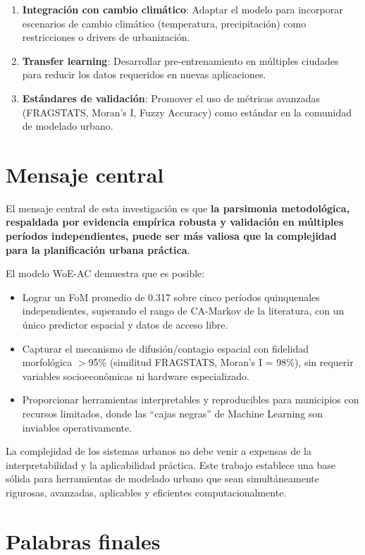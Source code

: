 \begin{enumerate}
	\item \textbf{Integración con cambio climático}: Adaptar el modelo para incorporar escenarios de cambio climático (temperatura, precipitación) como restricciones o drivers de urbanización.
	\item \textbf{Transfer learning}: Desarrollar pre-entrenamiento en múltiples ciudades para reducir los datos requeridos en nuevas aplicaciones.
	\item \textbf{Estándares de validación}: Promover el uso de métricas avanzadas (FRAGSTATS, Moran's I, Fuzzy Accuracy) como estándar en la comunidad de modelado urbano.
\end{enumerate}

\section{Mensaje central}

El mensaje central de esta investigación es que \textbf{la parsimonia metodológica, respaldada por evidencia empírica robusta y validación en múltiples períodos independientes, puede ser más valiosa que la complejidad para la planificación urbana práctica}.

El modelo WoE-AC demuestra que es posible:
\begin{itemize}
	\item Lograr un FoM promedio de 0.317 sobre cinco períodos quinquenales independientes, superando el rango de CA-Markov de la literatura, con un único predictor espacial y datos de acceso libre.
	\item Capturar el mecanismo de difusión/contagio espacial con fidelidad morfológica $>$95\% (similitud FRAGSTATS, Moran's I = 98\%), sin requerir variables socioeconómicas ni hardware especializado.
	\item Proporcionar herramientas interpretables y reproducibles para municipios con recursos limitados, donde las ``cajas negras'' de Machine Learning son inviables operativamente.
\end{itemize}

La complejidad de los sistemas urbanos no debe venir a expensas de la interpretabilidad y la aplicabilidad práctica. Este trabajo establece una base sólida para herramientas de modelado urbano que sean simultáneamente rigurosas, avanzadas, aplicables y eficientes computacionalmente.

\section{Palabras finales}

